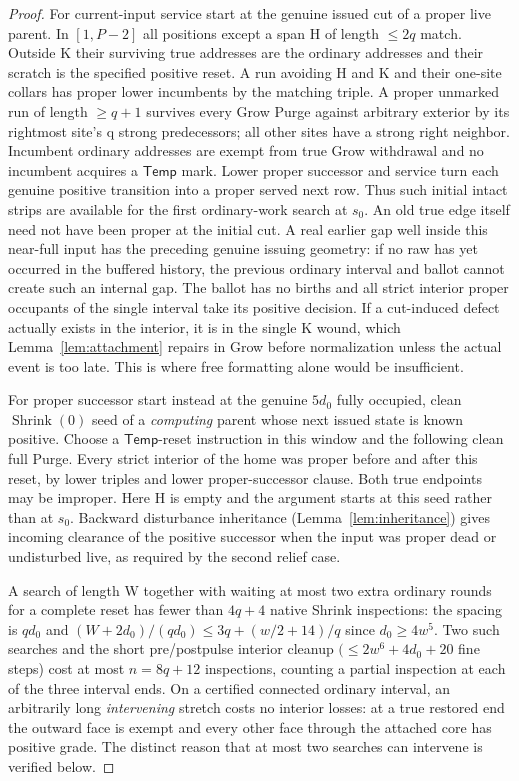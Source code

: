 \begin{proof}
For current-input service start at the genuine issued cut of a proper live parent. In \([1,P- 2]\) all positions except a span H of length \(\le\)\(2q\) match. Outside K their surviving true addresses are the ordinary addresses and their scratch is the specified positive reset. A run avoiding H and K and their one-site collars has proper lower incumbents by the matching triple. A proper unmarked run of length \(\ge\)\(q+1\) survives every Grow Purge against arbitrary exterior by its rightmost site's q strong predecessors; all other sites have a strong right neighbor. Incumbent ordinary addresses are exempt from true Grow withdrawal and no incumbent acquires a \(\mathsf{Temp}\) mark. Lower proper successor and service turn each genuine positive transition into a proper served next row. Thus such initial intact strips are available for the first ordinary-work search at \(s_0\). An old true edge itself need not have been proper at the initial cut. A real earlier gap well inside this near-full input has the preceding genuine issuing geometry: if no raw has yet occurred in the buffered history, the previous ordinary interval and ballot cannot create such an internal gap. The ballot has no births and all strict interior proper occupants of the single interval take its positive decision. If a cut-induced defect actually exists in the interior, it is in the single K wound, which Lemma~\ref{lem:attachment} repairs in Grow before normalization unless the actual event is too late. This is where free formatting alone would be insufficient.

For proper successor start instead at the genuine \(5d_0\) fully occupied, clean \(\operatorname{Shrink}(0)\) seed of a \emph{computing} parent whose next issued state is known positive. Choose a \(\mathsf{Temp}\)-reset instruction in this window and the following clean full Purge. Every strict interior of the home was proper before and after this reset, by lower triples and lower proper-successor clause. Both true endpoints may be improper. Here H is empty and the argument starts at this seed rather than at \(s_0\). Backward disturbance inheritance (Lemma~\ref{lem:inheritance}) gives incoming clearance of the positive successor when the input was proper dead or undisturbed live, as required by the second relief case.

A search of length W together with waiting at most two extra ordinary rounds for a complete reset has fewer than \(4q+4\) native Shrink inspections: the spacing is \(qd_0\) and \((W+2d_0)/(qd_0)\le3q+(w/2+14)/q\) since \(d_0\ge 4w^5\). Two such searches and the short pre/postpulse interior cleanup \((\le 2w^6+4d_0+20\) fine steps) cost at most \(n=8q+12\) inspections, counting a partial inspection at each of the three interval ends. On a certified connected ordinary interval, an arbitrarily long \emph{intervening} stretch costs no interior losses: at a true restored end the outward face is exempt and every other face through the attached core has positive grade. The distinct reason that at most two searches can intervene is verified below.


\end{proof}
